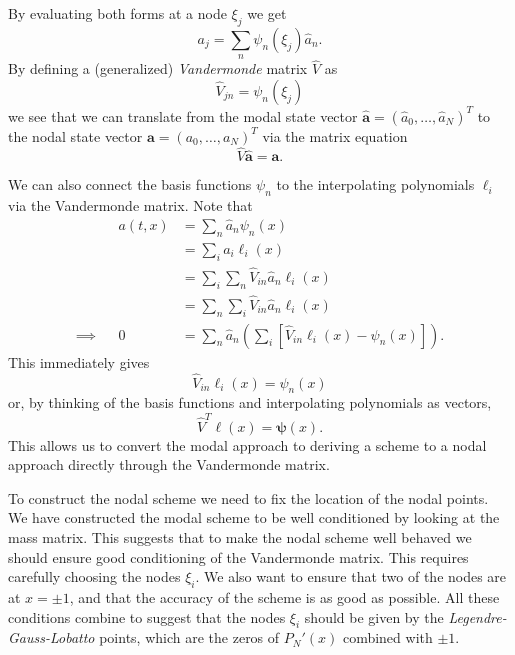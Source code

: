 By evaluating both forms at a node $\xi_j$ we get
%
\begin{equation}
  \label{eq:dg_nodal_vandermonde1}
  a_j = \sum_n \psi_n(\xi_j) \hat{a}_n.
\end{equation}
%
By defining a (generalized) \emph{Vandermonde} matrix $\hat{V}$ as
%
\begin{equation}
  \label{eq:dg_nodal_vandermonde2}
  \hat{V}_{jn} = \psi_n(\xi_j)
\end{equation}
%
we see that we can translate from the modal state vector
$\bm{\hat{a}} = (\hat{a}_0, \dots, \hat{a}_N)^T$ to the nodal state vector
$\bm{a} = (a_0, \dots, a_N)^T$ via the matrix equation
%
\begin{equation}
  \label{eq:dg_nodal_vandermonde3}
  \hat{V} \bm{\hat{a}} = \bm{a}.
\end{equation}

We can also connect the basis functions $\psi_n$ to the interpolating polynomials
$\ell_i$ via the Vandermonde matrix. Note that
%
\begin{subequations}
  \label{eq:dg_nodal_vandermonde4}
  \begin{align}
      && a(t, x) &= \sum_n \hat{a}_n \psi_n(x) \\
      && &= \sum_i a_i \ell_i(x) \\
      && &= \sum_i \sum_n \hat{V}_{in} \hat{a}_n \ell_i(x) \\
      && &= \sum_n \sum_i \hat{V}_{in} \hat{a}_n \ell_i(x) \\
      \implies && 0 &= \sum_n \hat{a}_n \left( \sum_i \left[ \hat{V}_{in} \ell_i(x) - \psi_n(x) \right] \right).
  \end{align}
\end{subequations}
%
This immediately gives
%
\begin{equation}
  \label{eq:dg_nodal_vandermonde5}
  \hat{V}_{in} \ell_i(x) = \psi_n(x)
\end{equation}
%
or, by thinking of the basis functions and interpolating polynomials as vectors,
%
\begin{equation}
  \label{eq:dg_nodal_vandermonde6}
  \hat{V}^T \bm{\ell}(x) = \bm{\psi}(x).
\end{equation}
%
This allows us to convert the modal approach to deriving a scheme to a nodal
approach directly through the Vandermonde matrix.

To construct the nodal scheme we need to fix the location of the nodal
points. We have constructed the modal scheme to be well conditioned by looking
at the mass matrix. This suggests that to make the nodal scheme well behaved we
should ensure good conditioning of the Vandermonde matrix. This requires
carefully choosing the nodes $\xi_i$. We also want to ensure that two of the
nodes are at $x = \pm 1$, and that the accuracy of the scheme is as good as
possible. All these conditions combine to suggest that the nodes $\xi_i$ should
be given by the \emph{Legendre-Gauss-Lobatto} points, which are the zeros of
$P_N'(x)$ combined with $\pm 1$.


